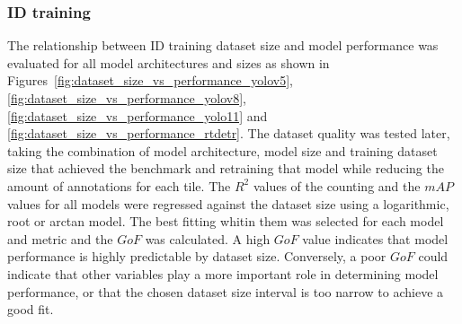 \documentclass[12pt,a4paper,oneside]{report}
\begin{document}
\subsubsection{ID training}

The relationship between ID training dataset size and model performance was evaluated 
for all model architectures and sizes as shown in Figures~\ref{fig:dataset_size_vs_performance_yolov5},
\ref{fig:dataset_size_vs_performance_yolov8},
\ref{fig:dataset_size_vs_performance_yolo11} and
\ref{fig:dataset_size_vs_performance_rtdetr}. 
The dataset quality was tested later, taking the combination of model architecture, model size and
training dataset size that achieved the benchmark and retraining that model while reducing the amount of
annotations for each tile. 
The $R^2$ values of the counting and the $mAP$ values for all models were regressed 
against the dataset size using a logarithmic, root or arctan model. The best fitting
whitin them was selected for each model and metric and the $GoF$ was calculated.
A high $GoF$ value indicates that model performance is highly predictable by dataset size. 
Conversely, a poor $GoF$ could indicate that other variables play a more important 
role in determining model performance, or that the chosen dataset size interval is 
too narrow to achieve a good fit.

\end{document}
